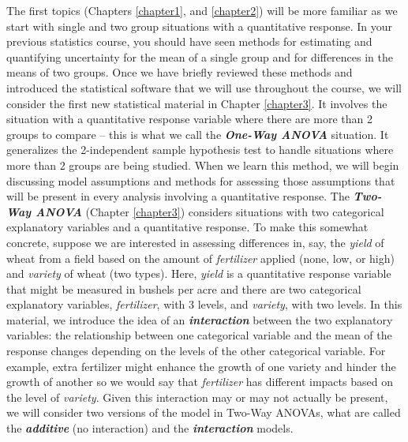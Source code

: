 \documentclass[]{book}
\renewcommand{\indent}{\hspace{15pt}}
\begin{document}
\indent The first topics (Chapters \ref{chapter1}, and \ref{chapter2}) will be more
familiar as we start with single and two group situations
with a quantitative response. In your previous statistics course, you should
have seen methods for estimating and quantifying uncertainty for the mean of a
single group and for differences in the means of two groups. Once we have briefly
reviewed these methods and introduced the statistical software that we will use
throughout the course, we will consider the first new statistical material in
Chapter \ref{chapter3}. It involves the situation with a quantitative response
variable where
there are more than 2 groups to compare -- this is what we call the \textbf{\emph{One-Way
ANOVA}} situation. It generalizes the 2-independent sample hypothesis
test to handle situations where more than 2 groups are being studied. When we
learn this method, we will begin discussing model assumptions  and methods for
assessing those assumptions that will be present in every analysis involving a
quantitative response. The \textbf{\emph{Two-Way ANOVA}} (Chapter \ref{chapter3})
considers situations with two categorical explanatory variables and a
quantitative response. To make
this somewhat concrete, suppose we are interested in assessing differences in,
say, the \emph{yield} of wheat from a field based on the amount of \emph{fertilizer} applied
(none, low, or high) and \emph{variety} of wheat (two types). Here, \emph{yield} is a quantitative response variable that might be measured in bushels per acre and
there are two categorical explanatory variables, \emph{fertilizer}, with 3 levels, and \emph{variety}, with two levels. In this material, we introduce the idea of an
\textbf{\emph{interaction}} between the two explanatory variables:  the relationship between one categorical
variable and the mean of the response changes depending on the levels of the
other categorical variable. For example, extra fertilizer might enhance the
growth of one variety and hinder the growth of another so we would say that \emph{fertilizer} has different impacts based on the level of \emph{variety}. Given this interaction may or may not actually be present, we will consider two versions of the model in Two-Way ANOVAs,  what are called the \textbf{\emph{additive}}  (no interaction) and the \textbf{\emph{interaction}}  models.
\end{document}
